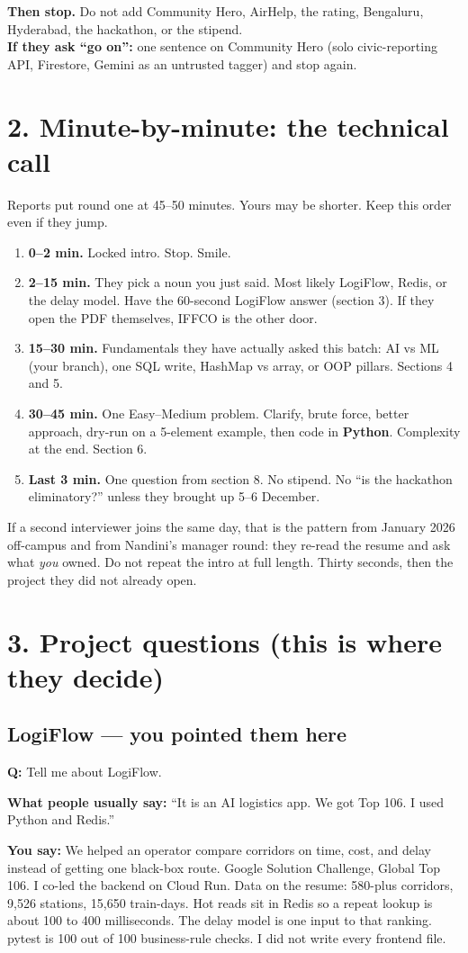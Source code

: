 \documentclass[a4paper,9.5pt]{extarticle}
\newcommand{\Q}[1]{\par\vspace{1.5pt}\noindent\textcolor{hot}{\textbf{Q:} #1}\par}
\newcommand{\Typ}[1]{\noindent\textcolor{muted}{\textbf{What people usually say:} #1}\par}
\newcommand{\Say}[1]{\noindent\textcolor{ok}{\textbf{You say:} #1}\par}
\begin{document}
\vspace{2pt}
\noindent\textbf{Then stop.} Do not add Community Hero, AirHelp, the rating, Bengaluru, Hyderabad, the hackathon, or the stipend.\\
\textbf{If they ask ``go on'':} one sentence on Community Hero (solo civic-reporting API, Firestore, Gemini as an untrusted tagger) and stop again.

\section{2. Minute-by-minute: the technical call}
Reports put round one at 45--50 minutes. Yours may be shorter. Keep this order even if they jump.
\begin{enumerate}[leftmargin=1.3em, itemsep=2pt]
  \item \textbf{0--2 min.} Locked intro. Stop. Smile.
  \item \textbf{2--15 min.} They pick a noun you just said. Most likely LogiFlow, Redis, or the delay model. Have the 60-second LogiFlow answer (section 3). If they open the PDF themselves, IFFCO is the other door.
  \item \textbf{15--30 min.} Fundamentals they have actually asked this batch: AI vs ML (your branch), one SQL write, HashMap vs array, or OOP pillars. Sections 4 and 5.
  \item \textbf{30--45 min.} One Easy--Medium problem. Clarify, brute force, better approach, dry-run on a 5-element example, then code in \textbf{Python}. Complexity at the end. Section 6.
  \item \textbf{Last 3 min.} One question from section 8. No stipend. No ``is the hackathon eliminatory?'' unless they brought up 5--6 December.
\end{enumerate}

If a second interviewer joins the same day, that is the pattern from January 2026 off-campus and from Nandini's manager round: they re-read the resume and ask what \emph{you} owned. Do not repeat the intro at full length. Thirty seconds, then the project they did not already open.

\section{3. Project questions (this is where they decide)}
\subsection{LogiFlow --- you pointed them here}
\Q{Tell me about LogiFlow.}
\Typ{``It is an AI logistics app. We got Top 106. I used Python and Redis.''}
\Say{We helped an operator compare corridors on time, cost, and delay instead of getting one black-box route. Google Solution Challenge, Global Top 106. I co-led the backend on Cloud Run. Data on the resume: 580-plus corridors, 9{,}526 stations, 15{,}650 train-days. Hot reads sit in Redis so a repeat lookup is about 100 to 400 milliseconds. The delay model is one input to that ranking. pytest is 100 out of 100 business-rule checks. I did not write every frontend file.}
\end{document}
